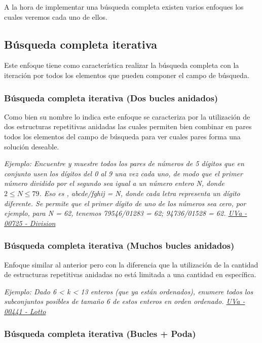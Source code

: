 A la hora de implementar una búsqueda completa existen varios enfoques los cuales veremos cada uno de ellos.

\subsection{Búsqueda completa iterativa}

Este enfoque tiene como característica realizar la búsqueda completa con la iteración por todos los elementos que pueden componer el campo de búsqueda. 

\subsubsection{Búsqueda completa iterativa (Dos bucles anidados)}

Como bien su nombre lo indica este enfoque se caracteriza por la utilización de dos estructuras repetitivas anidadas las cuales permiten bien combinar en pares todos los elementos del campo de búsqueda para ver cuales pares forma una solución deseable. 

\emph{Ejemplo: Encuentre y muestre todos los pares de números de 5 dígitos que en conjunto usen los dígitos del 0 al 9 una vez cada uno, de modo que el primer número dividido por el segundo sea igual a un número entero N, donde $2 \le N \le 79$. Eso es , abcde/fghij = N, donde cada letra representa un dígito diferente. Se permite que el primer dígito de uno de los números sea cero, por ejemplo, para N = 62, tenemos 79546/01283 = 62; 94736/01528 = 62. \href{https://onlinejudge.org/index.php?option=onlinejudge&Itemid=8&page=show_problem&problem=666}{UVa - 00725 - Division}}

\subsubsection{Búsqueda completa iterativa (Muchos bucles anidados)}

Enfoque similar al anterior pero con la diferencia que la utilización  de la cantidad de estructuras repetitivas anidadas no está limitada a una cantidad en específica.

\emph{Ejemplo: Dado 6 < k < 13 enteros (que ya están ordenados), enumere todos los subconjuntos posibles de tamaño 6 de estos enteros en orden ordenado. \href{https://onlinejudge.org/index.php?option=onlinejudge&Itemid=8&page=show_problem&problem=382}{UVa - 00441 - Lotto}}

\subsubsection{Búsqueda completa iterativa (Bucles + Poda)}


